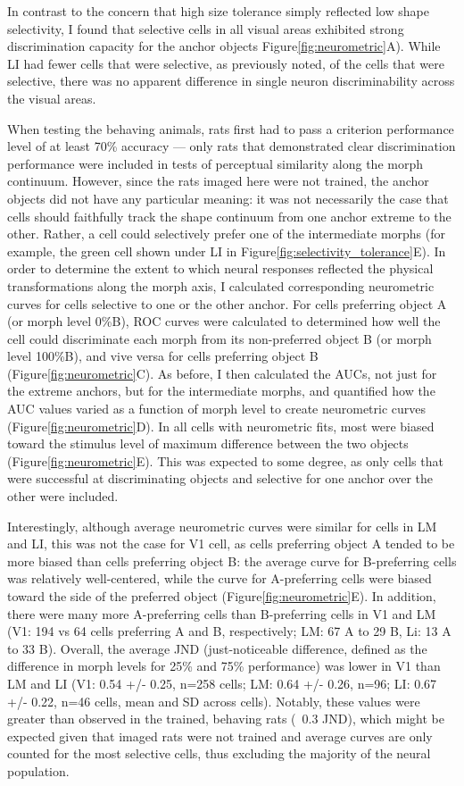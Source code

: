 In contrast to the concern that high size tolerance simply reflected low shape selectivity, I found that selective cells in all visual areas exhibited strong discrimination capacity for the anchor objects Figure\ref{fig:neurometric}A). While LI had fewer cells that were selective, as previously noted, of the cells that were selective, there was no apparent difference in single neuron discriminability across the visual areas. 

When testing the behaving animals, rats first had to pass a criterion performance level of at least 70\% accuracy --- only rats that demonstrated clear discrimination performance were included in tests of perceptual similarity along the morph continuum. However, since the rats imaged here were not trained, the anchor objects did not have any particular meaning: it was not necessarily the case that cells should faithfully track the shape continuum from one anchor extreme to the other. Rather, a cell could selectively prefer one of the intermediate morphs (for example, the green cell shown under LI in Figure\ref{fig:selectivity_tolerance}E). In order to determine the extent to which neural responses reflected the physical transformations along the morph axis, I calculated corresponding neurometric curves for cells selective to one or the other anchor. For cells preferring object A (or morph level 0\%B), ROC curves were calculated to determined how well the cell could discriminate each morph from its non-preferred object B (or morph level 100\%B), and vive versa for cells preferring object B (Figure\ref{fig:neurometric}C). As before, I then calculated the AUCs, not just for the extreme anchors, but for the intermediate morphs, and quantified how the AUC values varied as a function of morph level to create neurometric curves (Figure\ref{fig:neurometric}D). In all cells with neurometric fits, most were biased toward the stimulus level of maximum difference between the two objects (Figure\ref{fig:neurometric}E). This was expected to some degree, as only cells that were successful at discriminating objects and selective for one anchor over the other were included. 

Interestingly, although average neurometric curves were similar for cells in LM and LI, this was not the case for V1 cell, as cells preferring object A tended to be more biased than cells preferring object B: the average curve for B-preferring cells was relatively well-centered, while the curve for A-preferring cells were biased toward the side of the preferred object (Figure\ref{fig:neurometric}E). In addition, there were many more A-preferring cells than B-preferring cells in V1 and LM (V1: 194 vs 64 cells preferring A and B, respectively; LM: 67 A to 29 B, Li: 13 A to 33 B). Overall, the average JND (just-noticeable difference, defined as the difference in morph levels for 25\% and 75\% performance) was lower in V1 than LM and LI (V1: 0.54 +/- 0.25, n=258 cells; LM:  0.64 +/- 0.26, n=96; LI: 0.67 +/- 0.22, n=46 cells, mean and SD across cells). Notably, these values were greater than observed in the trained, behaving rats (~0.3 JND), which might be expected given that imaged rats were not trained and average curves are only counted for the most selective cells, thus excluding the majority of the neural population.

